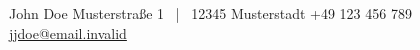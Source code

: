 \documentclass[darkhipster]{simplehipstercv}
\newlength{\rightcolwidth}
\begin{document}
\begin{paracol}{2}
\vfill{} %

\setlength{\parindent}{0pt}
\begin{minipage}[t]{\rightcolwidth}
\begin{center}\fontfamily{\sfdefault}\selectfont \color{black!70}
{\footnotesize John Doe  Musterstraße  1 ~|~ 12345 Musterstadt  +49 123 456 789   \protect\href{mailto:jjdoe@email.invalid}{jjdoe@email.invalid}
}
\end{center}
\end{minipage}

\clearpage

\end{paracol}
\end{document}
